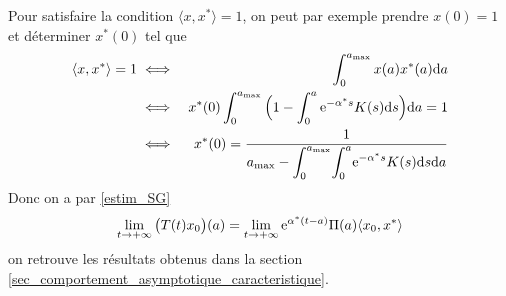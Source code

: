 Pour satisfaire la condition $\langle x,x^*\rangle =1$, on peut par exemple prendre $x(0)=1$ et déterminer $x^*(0)$ tel que 
\begin{eqnarray*}
    \langle x,x^*\rangle = 1 &\iff& \int_0^{a_{\max}}x(a)x^*(a)\mathrm{d} a \\
    &\iff& x^*(0)\int_0^{a_{\max}} \Big(1-\int_0^a\mathrm{e}^{-\alpha^*s}K(s)\mathrm{d} s\Big) \mathrm{d} a = 1 \\
    &\iff& x^*(0) = \frac{1}{a_{\max}-\displaystyle{\int_0^{a_{\max}}}\displaystyle{\int_0^a}\mathrm{e}^{-\alpha^* s}K(s)\mathrm{d} s\mathrm{d} a}
\end{eqnarray*}
Donc on a par \eqref{estim_SG}
\begin{equation*}
    \lim_{t \to +\infty} \big(T(t)x_0\big)(a) = \lim_{t \to +\infty} \mathrm{e}^{\alpha^*(t-a)}\Pi(a)\langle x_0,x^*\rangle
\end{equation*}
on retrouve les résultats obtenus dans la section \ref{sec_comportement_asymptotique_caracteristique}.